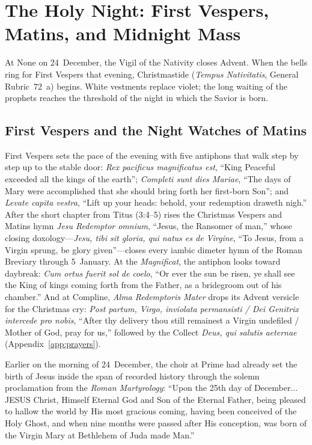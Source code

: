 \section{The Holy Night: First Vespers, Matins, and Midnight Mass}\label{sec:midnight}

At None on 24~December, the Vigil of the Nativity closes Advent. When the bells
ring for First Vespers that evening, Christmastide (\textit{Tempus Nativitatis},
General Rubric~72~a) begins. White vestments replace violet; the long waiting of
the prophets reaches the threshold of the night in which the Savior is born.

\subsection{First Vespers and the Night Watches of Matins}

First Vespers sets the pace of the evening with five antiphons that walk
step by step up to the stable door: \textit{Rex pacificus magnificatus est},
``King Peaceful exceeded all the kings of the earth''; \textit{Completi sunt
dies Mariae}, ``The days of Mary were accomplished that she should bring forth
her first-born Son''; and \textit{Levate capita vestra}, ``Lift up your heads:
behold, your redemption draweth nigh.'' After the short chapter from Titus
(3:4--5) rises the Christmas Vespers and Matins hymn \textit{Jesu Redemptor
omnium}, ``Jesus, the Ransomer of man,'' whose closing doxology---\textit{Jesu,
tibi sit gloria, qui natus es de Virgine}, ``To Jesus, from a Virgin sprung, be
glory given''---closes every iambic dimeter hymn of the Roman Breviary through
5~January. At the \textit{Magnificat}, the antiphon looks toward daybreak:
\textit{Cum ortus fuerit sol de coelo}, ``Or ever the sun be risen, ye shall see
the King of kings coming forth from the Father, as a bridegroom out of his
chamber.'' And at Compline, \textit{Alma Redemptoris Mater} drops its
Advent versicle for the Christmas cry: \textit{Post partum, Virgo, inviolata
permansisti / Dei Genitrix intercede pro nobis}, ``After thy delivery thou still
remainest a Virgin undefiled / Mother of God, pray for us,'' followed by the
Collect \textit{Deus, qui salutis aeternae} (Appendix~\ref{app:prayers}).

Earlier on the morning of 24~December, the choir at Prime had already set the
birth of Jesus inside the span of recorded history through the solemn
proclamation from the \textit{Roman Martyrology}: ``Upon the 25th day of
December... JESUS Christ, Himself Eternal God and Son of the Eternal Father,
being pleased to hallow the world by His most gracious coming, having been
conceived of the Holy Ghost, and when nine months were passed after His
conception, was born of the Virgin Mary at Bethlehem of Juda made Man.''


